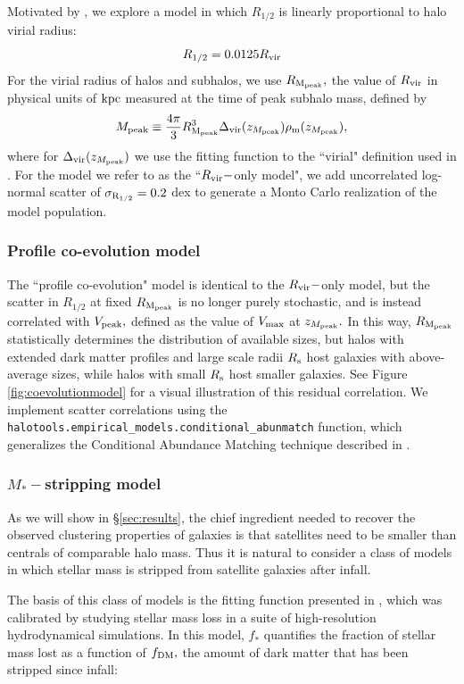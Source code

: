 \documentclass[usenatbib,usegraphicx,letterpaper]{mn2e}
\newcommand{\beq}{\begin{equation}}
\newcommand{\eeq}{\end{equation}}
\newcommand{\rhalf}{R_{1/2}}
\newcommand{\sigmarhalf}{\sigma_{\rm R_{1/2}}}
\newcommand{\mstar}{M_{\ast}}
\newcommand{\mpeak}{M_{\rm peak}}
\newcommand{\zpeak}{z_{M_{\rm peak}}}
\newcommand{\rvir}{R_{\rm vir}}
\newcommand{\rmpeak}{R_{\rm M_{peak}}}
\newcommand{\vmaxmpeak}{V_{\rm peak}}
\newcommand{\vmax}{V_{\rm max}}
\newcommand{\kpc}{{\rm kpc}}
\begin{document}
Motivated by \citet{kravtsov13}, we explore a model in which $\rhalf$ is linearly proportional to halo virial radius:
\beq
\label{eq:fiducial_model}
\rhalf = 0.0125\rvir
\eeq
For the virial radius of halos and subhalos, we use $\rmpeak,$ the value of $\rvir$ in physical units of $\kpc$ measured at the time of peak subhalo mass, defined by
\beq
\mpeak\equiv\frac{4\pi}{3}\rmpeak^{3}\Delta_{\rm vir}(\zpeak)\rho_{\rm m}(\zpeak),
\eeq
where for $\Delta_{\rm vir}(\zpeak)$ we use the fitting function to the ``virial" definition used in \citet{bryan_norman98}. For the model we refer to as the ``$\rvir-$only model", we add uncorrelated log-normal scatter of $\sigmarhalf=0.2$ dex to generate a Monto Carlo realization of the model population.

\subsubsection{Profile co-evolution model}
\label{subsubsec:coevolutionmodel}

The ``profile co-evolution" model is identical to the $\rvir-$only model, but the scatter in $\rhalf$ at fixed $\rmpeak$ is no longer purely stochastic, and is instead correlated with $\vmaxmpeak,$ defined as the value of $\vmax$ at $\zpeak.$ In this way, $\rmpeak$ statistically determines the distribution of available sizes, but halos with extended dark matter profiles and large scale radii $R_{\rm s}$ host galaxies with above-average sizes, while halos with small $R_{\rm s}$ host smaller galaxies. See Figure \ref{fig:coevolutionmodel} for a visual illustration of this residual correlation. We implement scatter correlations using the {\tt halotools.empirical\_models.conditional\_abunmatch} function, which generalizes the Conditional Abundance Matching technique described in \citet{hearin_etal13b}.

\subsubsection{$\mstar-$stripping model}
\label{subsubsec:strippingmodel}

As we will show in \S\ref{sec:results}, the chief ingredient needed to recover the observed clustering properties of galaxies is that satellites need to be smaller than centrals of comparable halo mass. Thus it is natural to consider a class of models in which stellar mass is stripped from satellite galaxies after infall.

The basis of this class of models is the fitting function presented in \citet{smith_etal16}, which was calibrated by studying stellar mass loss in a suite of high-resolution hydrodynamical simulations. In this model, $f_{\ast}$ quantifies the fraction of stellar mass lost as a function of $f_{\rm DM},$ the amount of dark matter that has been stripped since infall:
\end{document}
